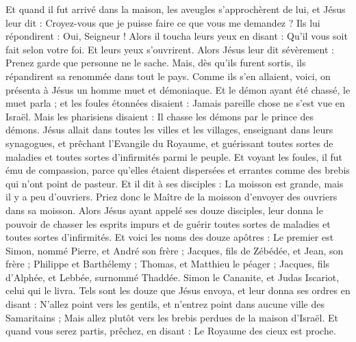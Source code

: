 \begin{multicols}{2}
Et quand il fut arrivé dans la maison, les aveugles s’approchèrent de lui, et Jésus leur dit : Croyez-vous que je puisse faire ce que vous me demandez ? Ils lui répondirent : Oui, Seigneur !
Alors il toucha leurs yeux en disant : Qu'il vous soit fait selon votre foi.
Et leurs yeux s’ouvrirent. Alors Jésus leur dit sévèrement : Prenez garde que personne ne le sache.
Mais, dès qu’ils furent sortis, ils répandirent sa renommée dans tout le pays.
Comme ils s’en allaient, voici, on présenta à Jésus un homme muet et démoniaque.
Et le démon ayant été chassé, le muet parla ; et les foules étonnées disaient : Jamais pareille chose ne s’est vue en Israël.
Mais les pharisiens disaient : Il chasse les démons par le prince des démons.
Jésus allait dans toutes les villes et les villages, enseignant dans leurs synagogues, et prêchant l'Evangile du Royaume, et guérissant toutes sortes de maladies et toutes sortes d'infirmités parmi le peuple.
Et voyant les foules, il fut ému de compassion, parce qu'elles étaient dispersées et errantes comme des brebis qui n'ont point de pasteur.
Et il dit à ses disciples : La moisson est grande, mais il y a peu d'ouvriers.
Priez donc le Maître de la moisson d’envoyer des ouvriers dans sa moisson.
\VerseOne{}Alors Jésus ayant appelé ses douze disciples, leur donna le pouvoir de chasser les esprits impurs et de guérir toutes sortes de maladies et toutes sortes d'infirmités.
Et voici les noms des douze apôtres : Le premier est Simon, nommé Pierre, et André son frère ; Jacques, fils de Zébédée, et Jean, son frère ;
Philippe et Barthélemy ; Thomas, et Matthieu le péager ; Jacques, fils d'Alphée, et Lebbée, surnommé Thaddée.
Simon le Cananite, et Judas Iscariot, celui qui le livra.
Tels sont les douze que Jésus envoya, et leur donna ses ordres en disant : N'allez point vers les gentils, et n'entrez point dans aucune ville des Samaritains ;
Mais allez plutôt vers les brebis perdues de la maison d'Israël.
Et quand vous serez partis, prêchez, en disant : Le Royaume des cieux est proche.

\end{multicols}
